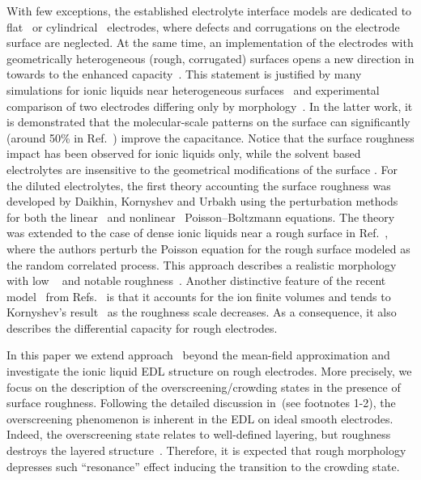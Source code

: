 With few exceptions, the established electrolyte interface models are dedicated to flat~\cite{kornyshev2007double,goodwin2017mean,bazant2011double} or cylindrical~\cite{janssen2019curvature} electrodes, where defects and corrugations on the electrode surface are neglected. At the same time, an implementation of the electrodes with geometrically heterogeneous (rough, corrugated) surfaces opens a new direction in towards to the enhanced capacity~\cite{vatamanu2015non}. This statement is justified by many simulations for ionic liquids near heterogeneous surfaces~\cite{vatamanu2011influence,xing2012nanopatterning,hu2013molecular,vatamanu2014influence, bedrov2015ionic, vatamanu2017charge} and experimental comparison of two electrodes differing only by morphology~\cite{wei2020surface}. In the latter work, it is demonstrated that the molecular-scale patterns on the surface can significantly (around 50\% in Ref.~\cite{wei2020surface}) improve the capacitance. Notice that the surface roughness impact has been observed for ionic liquids only, while the solvent based electrolytes are insensitive to the geometrical modifications of the surface .
For the diluted electrolytes, the first theory accounting the surface roughness was developed by Daikhin, Kornyshev and Urbakh using the perturbation methods for both the linear~\cite{daikhin1996double} and nonlinear~\cite{daikhin1998nonlinear} Poisson--Boltzmann equations. The theory was extended to the case of dense ionic liquids near a rough surface in Ref.~\cite{aslyamov2021electrolyte}, where the authors perturb the Poisson equation for the rough surface modeled as the random correlated process. This approach describes a realistic morphology with low ~\cite{aslyamov2017density,aslyamov2019random} and notable roughness~\cite{aslyamov2019theoretical}. Another distinctive feature of the recent model~\cite{aslyamov2021electrolyte} from Refs.~\cite{daikhin1996double, daikhin1998nonlinear} is that it accounts for the ion finite volumes and tends to Kornyshev's result~\cite{kornyshev2007double} as the roughness scale decreases. As a consequence, it also describes the differential capacity for rough electrodes. 

In this paper we extend approach~\cite{aslyamov2021electrolyte} beyond the mean-field approximation and investigate the ionic liquid EDL structure on rough electrodes. More precisely, we focus on the description of the overscreening/crowding states in the presence of surface roughness. 
Following the detailed discussion in~\cite{goodwin2017mean}(see footnotes 1-2), the overscreening phenomenon is inherent in the EDL on ideal smooth electrodes. Indeed, the overscreening state relates to well-defined layering, but roughness destroys the layered structure~\cite{sheehan2016layering}. 
Therefore, it is expected that rough morphology depresses such ``resonance'' effect inducing the transition to the crowding state. 

